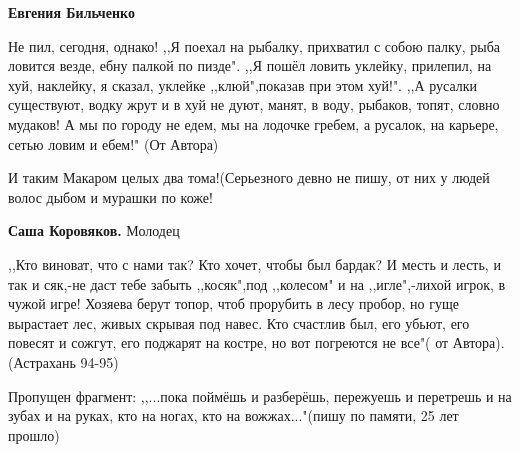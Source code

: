\begin{itemize}
\begin{itemize}
\textbf{Евгения Бильченко} 

Не пил, сегодня, однако! ,,Я поехал на рыбалку, прихватил с собою палку, рыба
ловится везде, ебну палкой по пизде". ,,Я пошёл ловить уклейку, прилепил, на
хуй, наклейку, я сказал, уклейке ,,клюй",показав при этом хуй!". ,,А русалки
существуют, водку жрут и в хуй не дуют, манят, в воду, рыбаков, топят, словно
мудаков! А мы по городу не едем, мы на лодочке гребем, а русалок, на карьере, сетью
ловим и ебем!" (От Автора)


 
И таким Макаром целых два тома!(Серьезного девно не пишу, от них у людей волос дыбом и мурашки по коже!

 
\textbf{Саша Коровяков.} Молодец

 

,,Кто виноват, что с нами так? Кто хочет, чтобы был бардак? И месть и лесть, и так
и сяк,-не даст тебе забыть ,,косяк",под ,,колесом" и на ,,игле",-лихой игрок, в
чужой игре! Хозяева берут топор, чтоб прорубить в лесу пробор, но гуще вырастает
лес, живых скрывая под навес. Кто счастлив был, его убьют, его повесят и сожгут, его
поджарят на костре, но вот погреются не все"( от Автора).(Астрахань 94-95)


 

Пропущен фрагмент: ,,...пока поймёшь и разберёшь, пережуешь и перетрешь и на
зубах и на руках, кто на ногах, кто на вожжах..."(пишу по памяти, 25 лет прошло)


\end{itemize}
\end{itemize}
